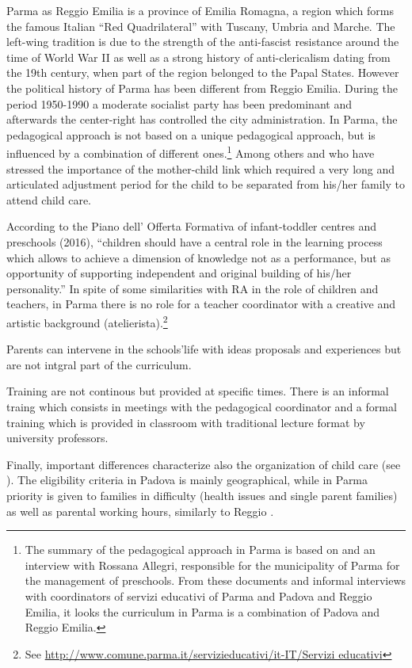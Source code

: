 \documentclass[12pt]{article}
\begin{document}
Parma as Reggio Emilia is a province of Emilia Romagna, a region which forms the famous Italian ``Red Quadrilateral'' with Tuscany, Umbria and Marche. The left-wing tradition is due to the strength of the anti-fascist resistance around the time of World War II as well as a strong history of anti-clericalism dating from the 19th century, when part of the region belonged to the Papal States. However the political history of Parma has been different from Reggio Emilia. During the period 1950-1990 a moderate socialist party has been predominant and afterwards the center-right has controlled the city administration. In Parma, the pedagogical approach is not based on a unique pedagogical approach, but is influenced by a combination of different ones.\footnote{The summary of the pedagogical approach in Parma is based on \cite{Parma2006} and an interview with Rossana Allegri, responsible for the municipality of Parma for the management of preschools. From these documents and informal interviews with coordinators of servizi educativi of Parma and Padova and Reggio Emilia, it looks the curriculum in Parma is a combination of Padova and Reggio Emilia.} Among others \cite{Winnicott1965} and \cite{Bion1962} who have stressed the importance of the mother-child link which required a very long and articulated adjustment period for the child to be separated from his/her family to attend child care.

According to the Piano dell' Offerta Formativa of infant-toddler centres and preschools (2016), ``children should have a central role in the learning process which allows to achieve a dimension of knowledge not as a performance, but as opportunity of supporting independent and original building of his/her personality.'' In spite of some similarities with RA in the role of children and teachers, in Parma there is no role for a teacher coordinator with a creative and artistic background (atelierista).\footnote{See \url{http://www.comune.parma.it/servizieducativi/it-IT/Servizi educativi}} 

Parents can intervene in the schools'life with ideas proposals and experiences but are not intgral part of the curriculum.

Training are not continous but provided at specific times. There is an informal traing which consists in meetings with the pedagogical coordinator and a formal training which is provided in classroom with traditional lecture format by university professors.

Finally, important differences characterize also the organization of child care (see \cite{DelBoca2016}). The eligibility criteria in Padova is mainly geographical, while in Parma priority is given to families in difficulty (health issues and single parent families) as well as parental working hours, similarly to Reggio \citep{Frabboni1999}.
\end{document}
